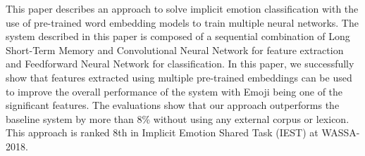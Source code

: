 This paper describes an approach to solve implicit emotion classification with the use of pre-trained word embedding models to train multiple neural networks. The system described in this paper is composed of a sequential combination of Long Short-Term Memory and Convolutional Neural Network for feature extraction and Feedforward Neural Network for classification. In this paper, we successfully show that features extracted using multiple pre-trained embeddings can be used to improve the overall performance of the system with Emoji being one of the significant features. The evaluations show that our approach outperforms the baseline system by more than 8\% without using any external corpus or lexicon. This approach is ranked 8th in Implicit Emotion Shared Task (IEST) at WASSA-2018.
